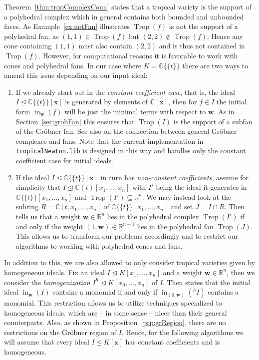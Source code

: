 \documentclass[
  paper=a4,
  titlepage,
  bibliography=totoc,
  listof=totoc,
  pagesize=pdftex
]{scrartcl}
\numberwithin{figure}{section}
\numberwithin{equation}{section}
\numberwithin{table}{section}
\newcommand*\setR{\mathds{R}}
\newcommand*\setC{\mathds{C}}
\newcommand*\puiseux[2]{#1\{\!\{#2\}\!\}}
\newcommand*\CCt{\puiseux{\setC}{t}}
\let\vec\mathbf
\let\idealof\trianglelefteq
\DeclareMathOperator{\Trop}{Trop}
\DeclareMathOperator{\initial}{in}
\theoremstyle{definition}
\numberwithin{definition}{section}
\begin{document}
Theorem~\ref{thm:tropComplexConn} states that a tropical variety is the support of a
polyhedral complex which in general contains both bounded and unbounded faces. As
Example~\ref{ex:notFan} illustrates $\Trop(f)$ is not the support of a polyhedral fan, as
$(1,1) \in \Trop(f)$ but $(2,2) \not\in \Trop(f)$. Hence any cone containing $(1,1)$ must
also contain $(2,2)$ and is thus not contained in $\Trop(f)$. However, for computational
reasons it is favorable to work with cones and polyhedral fans. In our case where $K =
\CCt$ there are two ways to amend this issue depending on our input ideal:
\begin{enumerate}[label=\arabic*.]
  \item If we already start out in the \emph{constant coefficient case}, that is, the
    ideal $I \idealof \CCt[\vec x]$ is generated by elements of $\setC[\vec x]$, then for
    $f \in I$ the initial form $\initial_{\vec w}(f)$ will be just the minimal terms with
    respect to $\vec w$. As in Section~\ref{sec:grobFan} this ensures that $\Trop(I)$ is
    the support of a subfan of the Gröbner fan. See also
    \cite[Remark~2.5.11]{sturmMacTrop} on the connection between general Gröbner complexes
    and fans. Note that the current implementation in \texttt{tropicalNewton.lib}
    \cite{tropNewtLib} is designed in this way and handles only the constant coefficient
    case for initial ideals.
  \item If the ideal $I\idealof\CCt[\vec x]$ in turn has \emph{non-constant coefficients},
    assume for simplicity that $I \idealof \setC(t)[x_1, \dots, x_n]$ with $I'$ being the
    ideal it generates in $\CCt[x_1, \dots, x_n]$ and $\Trop(I') \subseteq \setR^n$. We
    may instead look at the subring $R = \setC[t, x_1, \dots, x_n]$ of $\CCt[x_1, \dots,
    x_n]$ and set $J = I\cap R$. Then \cite[Lemma~1.1]{compTropVar} tells us that a weight
    $\vec w \in \setR^n$ lies in the polyhedral complex $\Trop(I')$ if and only if the
    weight $(1,\vec w) \in \setR^{n+1}$ lies in the polyhedral fan $\Trop(J)$. This allows
    us to transform our problems accordingly and to restrict our algorithms to working
    with polyhedral cones and fans.
\end{enumerate}
In addition to this, we are also allowed to only consider tropical varieties given by
homogeneous ideals. Fix an ideal $I\idealof K[x_1, \dots, x_n]$ and a weight $\vec w \in
\setR^n$, then we consider the \emph{homogenization} $I^h \idealof K[x_0, \dots, x_n]$ of
$I$. Then \cite[Lemma~2.2]{compTropVar} states that the initial ideal $\initial_{\vec
w}(I)$ contains a monomial if and only if $\initial_{(0,\vec w)}(^hI)$ contains a
monomial. This restriction allows us to utilize techniques specialized to homogeneous
ideals, which are -- in some sense -- nicer than their general counterparts. Also, as
shown in Proposition~\ref{prp:grRegion}, there are no restrictions on the Gröbner region
of $I$. Hence, for the following algorithms we will assume that every ideal $I \idealof
K[\vec x]$ has constant coefficients and is homogeneous.
\end{document}
